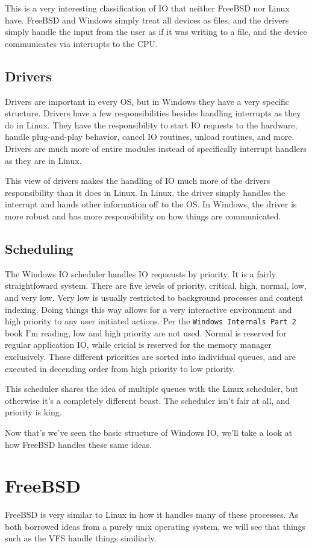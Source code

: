  This is a very interesting classification of IO that neither FreeBSD nor Linux
 have. FreeBSD and Windows simply treat all devices as files, and the drivers
 simply handle the input from the user as if it was writing to a file, and the
 device communicates via interrupts to the CPU.

 \subsection{Drivers}
 Drivers are important in every OS, but in Windows they have a very specific
 structure. Drivers have a few responsibilities besides handling interrupts as
 they do in Linux. They have the responsibility to start IO requests to the hardware,
 handle plug-and-play behavior, cancel IO routines, unload routines, and more.
 Drivers are much more of entire modules instead of specifically interrupt handlers
 as they are in Linux. \cite{internals2}

 This view of drivers makes the handling of IO much more of the drivers responsibility
 than it does in Linux. In Linux, the driver simply handles the interrupt and hands
 other information off to the OS. In Windows, the driver is more robust and has
 more responsibility on how things are communicated.
 \subsection{Scheduling}
 The Windows IO scheduler handles IO requeusts by priority. It is a fairly
 straightfoward system. There are five levels of priority, critical, high, normal,
 low, and very low. Very low is usually restricted to background processes and
 content indexing. Doing things this way allows for a very interactive environment
 and high priority to any user initiated actions. Per the \texttt{Windows Internals Part 2}
 book I'm reading, low and high priority are not used. Normal is reserved for
 regular application IO, while cricial is reserved for the memory manager exclusively.
 These different priorities are sorted into individual queues, and are executed
 in decending order from high priority to low priority.

 This scheduler shares the idea of multiple queues with the Linux scheduler, but
 otherwise it's a completely different beast. The scheduler isn't fair at all,
 and priority is king.\cite{internals2}

 Now that's we've seen the basic structure of Windows IO, we'll take a look at
 how FreeBSD handles these same ideas.
\section{FreeBSD}
  FreeBSD is very similar to Linux in how it handles many of these processes. As
  both borrowed ideas from a purely unix operating system, we will see that things
  such as the VFS handle things similiarly.

